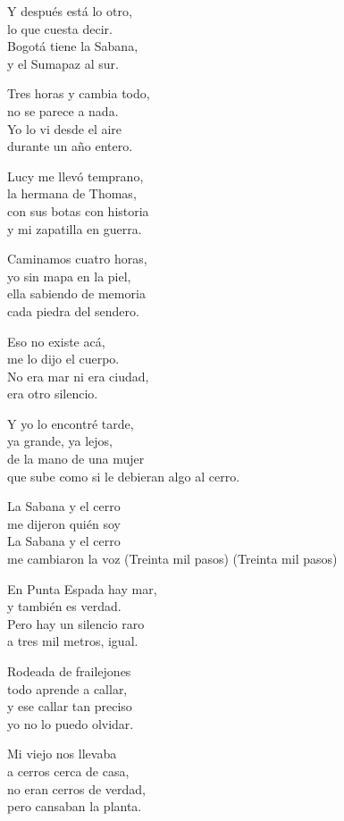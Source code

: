 \begin{lyrics}
Y después está lo otro,\\
lo que cuesta decir.\\
Bogotá tiene la Sabana,\\
y el Sumapaz al sur.

Tres horas y cambia todo,\\
no se parece a nada.\\
Yo lo vi desde el aire\\
durante un año entero.

Lucy me llevó temprano,\\
la hermana de Thomas,\\
con sus botas con historia\\
y mi zapatilla en guerra.

Caminamos cuatro horas,\\
yo sin mapa en la piel,\\
ella sabiendo de memoria\\
cada piedra del sendero.

Eso no existe acá,\\
me lo dijo el cuerpo.\\
No era mar ni era ciudad,\\
era otro silencio.

Y yo lo encontré tarde,\\
ya grande, ya lejos,\\
de la mano de una mujer\\
que sube como si le debieran algo al cerro.

La Sabana y el cerro\\
me dijeron quién soy\\
La Sabana y el cerro\\
me cambiaron la voz
(Treinta mil pasos)
(Treinta mil pasos)

En Punta Espada hay mar,\\
y también es verdad.\\
Pero hay un silencio raro\\
a tres mil metros, igual.

Rodeada de frailejones\\
todo aprende a callar,\\
y ese callar tan preciso\\
yo no lo puedo olvidar.

Mi viejo nos llevaba\\
a cerros cerca de casa,\\
no eran cerros de verdad,\\
pero cansaban la planta.


\end{lyrics}
